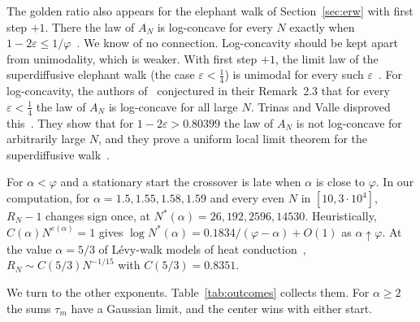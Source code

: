 The golden ratio also appears for the elephant walk of
Section~\ref{sec:erw} with first step $+1$. There the law of $A_N$ is
log-concave for every $N$ exactly when
$1-2\varepsilon\le1/\varphi$~\cite[Proposition~2.2]{glrs2025}. We know of no
connection. Log-concavity should be kept apart from unimodality, which is
weaker. With first step $+1$, the limit law of the superdiffusive elephant
walk (the case $\varepsilon<\frac14$) is unimodal for every such
$\varepsilon$~\cite[Theorem~1.1]{glrs2025}. For log-concavity, the authors
of~\cite{glrs2025} conjectured in their Remark~2.3 that for every
$\varepsilon<\frac14$ the law of $A_N$ is log-concave for all large $N$.
Trinas and Valle disproved this~\cite[Theorem~4.4]{tv2026}. They show that
for $1-2\varepsilon>0.80399$ the law of $A_N$ is not log-concave for
arbitrarily large $N$, and they prove a uniform local limit theorem for the
superdiffusive walk~\cite[Theorem~3.1]{tv2026}.

\begin{remark}\label{rem:crossover}
For $\alpha<\varphi$ and a stationary start the crossover is late when
$\alpha$ is close to $\varphi$. In our computation, for $\alpha=1.5,1.55,1.58,1.59$ and every even
$N$ in $[10,3\cdot10^4]$, $R_N-1$ changes sign once, at
$N^*(\alpha)=26,192,2596,14530$. Heuristically, $C(\alpha)N^{e(\alpha)}=1$
gives $\log N^*(\alpha)=0.1834/(\varphi-\alpha)+O(1)$ as
$\alpha\uparrow\varphi$. At the value $\alpha=5/3$ of L\'evy-walk models of
heat conduction~\cite{dsd2013,zdk2015}, $R_N\sim C(5/3)N^{-1/15}$ with
$C(5/3)=0.8351$.
\end{remark}

We turn to the other exponents. Table~\ref{tab:outcomes} collects them. For
$\alpha\ge2$ the sums $\tau_m$ have a Gaussian limit, and the center wins
with either start.

